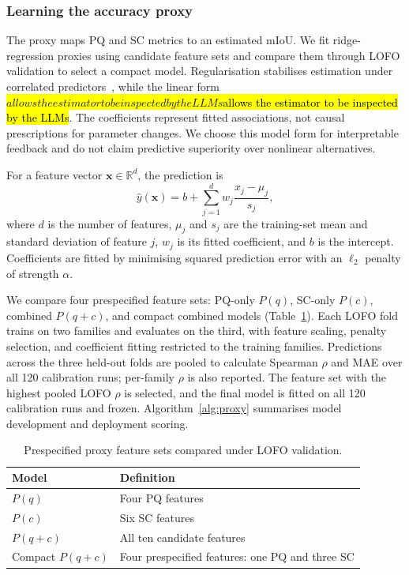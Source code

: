 \documentclass[a4paper,fleqn]{cas-dc}
\let\texthl\hl
\renewcommand{\hl}[1]{\ifmmode\colorbox{yellow}{\ensuremath{#1}}\else\texthl{#1}\fi}
\begin{document}
\subsubsection{Learning the accuracy proxy}
\label{sec:ridge-proxy}

The proxy maps PQ and SC metrics to an estimated mIoU. We fit ridge-regression proxies using candidate feature sets and compare them through LOFO validation to select a compact model. Regularisation stabilises estimation under correlated predictors~\cite{hoerl1970ridge,pedregosa2011sklearn}, while the linear form \hl{allows the estimator to be inspected by the LLMs}. The coefficients represent fitted associations, not causal prescriptions for parameter changes. We choose this model form for interpretable feedback and do not claim predictive superiority over nonlinear alternatives.

For a feature vector $\mathbf{x}\in\mathbb{R}^{d}$, the prediction is
\begin{equation}
\hat{y}(\mathbf{x})
=
b+\sum_{j=1}^{d}
w_j\frac{x_j-\mu_j}{s_j},
\label{eq:ridge-proxy}
\end{equation}
where $d$ is the number of features, $\mu_j$ and $s_j$ are the training-set mean and standard deviation of feature $j$, $w_j$ is its fitted coefficient, and $b$ is the intercept. Coefficients are fitted by minimising squared prediction error with an $\ell_2$ penalty of strength $\alpha$.

We compare four prespecified feature sets: PQ-only $P(q)$, SC-only $P(c)$, combined $P(q{+}c)$, and compact combined models (Table~\ref{tab:proxy-ablation}). Each LOFO fold trains on two families and evaluates on the third, with feature scaling, penalty selection, and coefficient fitting restricted to the training families. Predictions across the three held-out folds are pooled to calculate Spearman $\rho$ and MAE over all 120 calibration runs; per-family $\rho$ is also reported. The feature set with the highest pooled LOFO $\rho$ is selected, and the final model is fitted on all 120 calibration runs and frozen. Algorithm~\ref{alg:proxy} summarises model development and deployment scoring.

\begin{table}[ht]
\caption{Prespecified proxy feature sets compared under LOFO validation.}
\label{tab:proxy-ablation}
\centering
\begin{tabular}{p{} p{}}
\toprule
Model & Definition \\
\midrule
$P(q)$ & Four PQ features \\
$P(c)$ & Six SC features \\
$P(q{+}c)$ & All ten candidate features \\
Compact $P(q{+}c)$ & Four prespecified features: one PQ and three SC \\
\bottomrule
\end{tabular}
\end{table}
\end{document}
